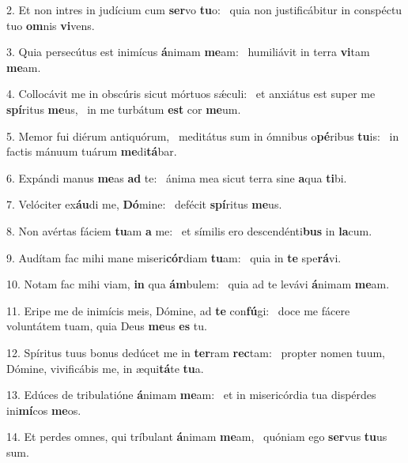 2. Et non intres in judícium cum \textbf{ser}vo \textbf{tu}o: \ast\  quia non justificábitur in conspéctu tuo \textbf{om}nis \textbf{vi}vens.\

3. Quia persecútus est inimícus \textbf{á}nimam \textbf{me}am: \ast\  humiliávit in terra \textbf{vi}tam \textbf{me}am.\

4. Collocávit me in obscúris sicut mórtuos sǽculi: \dag\  et anxiátus est super me \textbf{spí}ritus \textbf{me}us, \ast\  in me turbátum \textbf{est} cor \textbf{me}um.\

5. Memor fui diérum antiquórum, \dag\  meditátus sum in ómnibus o\textbf{pé}ribus \textbf{tu}is: \ast\  in factis mánuum tuárum \textbf{me}di\textbf{tá}bar.\

6. Expándi manus \textbf{me}as \textbf{ad} te: \ast\  ánima mea sicut terra sine \textbf{a}qua \textbf{ti}bi.\

7. Velóciter ex\textbf{áu}di me, \textbf{Dó}mine: \ast\  defécit \textbf{spí}ritus \textbf{me}us.\

8. Non avértas fáciem \textbf{tu}am \textbf{a} me: \ast\  et símilis ero descendénti\textbf{bus} in \textbf{la}cum.\

9. Audítam fac mihi mane miseri\textbf{cór}diam \textbf{tu}am: \ast\  quia in \textbf{te} spe\textbf{rá}vi.\

10. Notam fac mihi viam, \textbf{in} qua \textbf{ám}bulem: \ast\  quia ad te levávi \textbf{á}nimam \textbf{me}am.\

11. Eripe me de inimícis meis, Dómine, ad \textbf{te} con\textbf{fú}gi: \ast\  doce me fácere voluntátem tuam, quia Deus \textbf{me}us \textbf{es} tu.\

12. Spíritus tuus bonus dedúcet me in \textbf{ter}ram \textbf{rec}tam: \ast\  propter nomen tuum, Dómine, vivificábis me, in æqui\textbf{tá}te \textbf{tu}a.\

13. Edúces de tribulatióne \textbf{á}nimam \textbf{me}am: \ast\  et in misericórdia tua dispérdes ini\textbf{mí}cos \textbf{me}os.\

14. Et perdes omnes, qui tríbulant \textbf{á}nimam \textbf{me}am, \ast\  quóniam ego \textbf{ser}vus \textbf{tu}us sum.\

